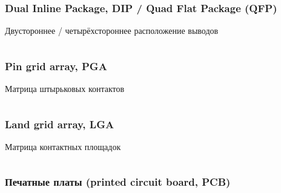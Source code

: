 \begin{frame}
\frametitle{Dual Inline Package, DIP / Quad Flat Package (QFP)}
Двустороннее / четырёхстороннее расположение выводов
\begin{columns}
    \column{6cm} 
    \column{5cm} 
\end{columns}
\end{frame}

\begin{frame}
\frametitle{Pin grid array, PGA}
Матрица штырьковых контактов
\begin{columns}
    \column{6cm} 
    \column{5cm} 
\end{columns}
\end{frame}

\begin{frame}
\frametitle{Land grid array, LGA}
Матрица контактных площадок
\begin{columns}
    \column{6cm} 
    \column{5.5cm} 
\end{columns}
\end{frame}

\begin{frame}
\frametitle{Печатные платы (printed circuit board, PCB)}
\end{frame}

